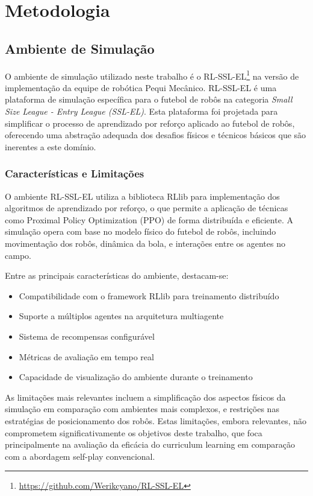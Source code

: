 \chapter{Metodologia}
\label{cap:metodologia}

\section{Ambiente de Simulação}
\label{sec:ambiente_simulacao}

O ambiente de simulação utilizado neste trabalho é o RL-SSL-EL\footnote{\url{https://github.com/Werikcyano/RL-SSL-EL}} na versão de implementação da equipe de robótica Pequi Mecânico. RL-SSL-EL é uma plataforma de simulação específica para o futebol de robôs na categoria \textit{Small Size League - Entry League (SSL-EL)}. Esta plataforma foi projetada para simplificar o processo de aprendizado por reforço aplicado ao futebol de robôs, oferecendo uma abstração adequada dos desafios físicos e técnicos básicos que são inerentes a este domínio.

\subsection{Características e Limitações}

O ambiente RL-SSL-EL utiliza a biblioteca RLlib para implementação dos algoritmos de aprendizado por reforço, o que permite a aplicação de técnicas como Proximal Policy Optimization (PPO) de forma distribuída e eficiente. A simulação opera com base no modelo físico do futebol de robôs, incluindo movimentação dos robôs, dinâmica da bola, e interações entre os agentes no campo.

Entre as principais características do ambiente, destacam-se:

\begin{itemize}
    \item Compatibilidade com o framework RLlib para treinamento distribuído
    \item Suporte a múltiplos agentes na arquitetura multiagente
    \item Sistema de recompensas configurável
    \item Métricas de avaliação em tempo real
    \item Capacidade de visualização do ambiente durante o treinamento
\end{itemize}

As limitações mais relevantes incluem a simplificação dos aspectos físicos da simulação em comparação com ambientes mais complexos, e restrições nas estratégias de posicionamento dos robôs. Estas limitações, embora relevantes, não comprometem significativamente os objetivos deste trabalho, que foca principalmente na avaliação da eficácia do curriculum learning em comparação com a abordagem self-play convencional.

